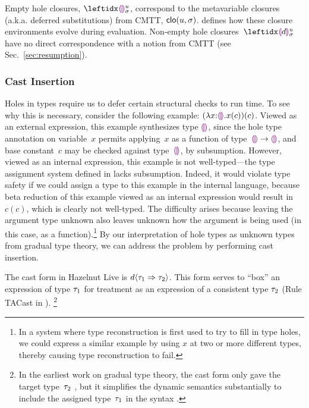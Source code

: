 Empty hole closures, $\dehole{u}{\sigma}{}$,  correspond to the metavariable closures (a.k.a. deferred substitutions) from CMTT, $\mathsf{clo}(u, \sigma)$.
%
 defines how these closure environments evolve during evaluation.
%
Non-empty hole closures~$\dhole{d}{u}{\sigma}{}$ have no direct correspondence with a notion from CMTT (see Sec.~\ref{sec:resumption}).

\subsubsection{Cast Insertion}\label{sec:cast-insertion}
%
%
Holes in types require us to defer certain structural checks to run time.
%
To see why this is necessary, consider the following
example: $(\lambda x{:}\textcolor{violet}{\llparenthesis}\textcolor{violet}{\rrparenthesis}.x(c))(c)$.
%
Viewed as an external expression, this example synthesizes type
$\textcolor{violet}{\llparenthesis}\textcolor{violet}{\rrparenthesis}$, since the hole type annotation on variable~$x$ permits
applying~$x$ as a function of type~$\textcolor{violet}{\llparenthesis}\textcolor{violet}{\rrparenthesis} \rightarrow \textcolor{violet}{\llparenthesis}\textcolor{violet}{\rrparenthesis}$, and base
constant~$c$ may be checked against type~$\textcolor{violet}{\llparenthesis}\textcolor{violet}{\rrparenthesis}$, by subsumption.
%
However, viewed as an internal expression, this example is not
well-typed---the type assignment system defined in
 lacks subsumption.
%
Indeed, it would violate type safety if we could assign a type to this
example in the internal language, because beta reduction of this
example viewed as an internal expression would result in $c(c)$, which
is clearly not well-typed.
%
The difficulty arises because leaving the argument type unknown also leaves unknown how
the argument is being used (in this case, as a function).\footnote{In a system where type reconstruction is first used
to try to fill in type holes, we could express a similar example by
using $x$ at two or more different types, thereby causing type
reconstruction to fail.
%
}
By our interpretation of hole types as unknown types from gradual type
theory, we can address the problem by performing cast insertion.
%

The cast form in Hazelnut Live is $d \langle{\tau_1}\Rightarrow{\tau_2}\rangle$.
%
This form serves to ``box'' an expression of type $\tau_1$ for
treatment as an expression of a consistent type $\tau_2$
(Rule TACast in ).%
\footnote{
In the earliest work on gradual type theory, the cast form only gave
the target type~$\tau_2$ \cite{Siek06a}, but it simplifies the dynamic semantics substantially
to include the assigned type~$\tau_1$ in the syntax \cite{DBLP:conf/snapl/SiekVCB15}.
}


